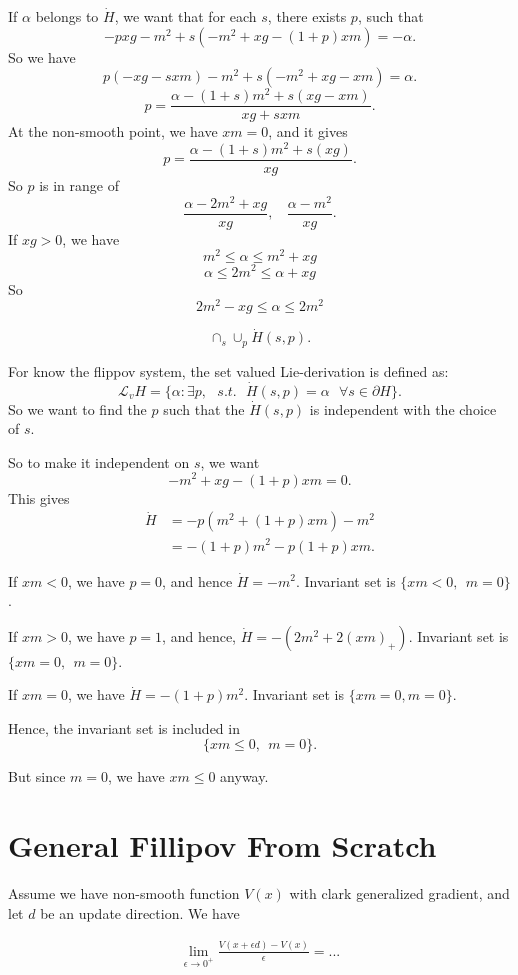 \documentclass[letterpaper,11pt]{article}
\begin{document}
If $\alpha$ belongs to $\dot H$, we want that for each $s$, there exists $p$, such that 
$$
- p x g - m^2 + s (- m^2 + xg - (1+p)xm) = -\alpha.
$$
So we have 
$$
p (-xg - s x m ) - m^2 + s (-m^2 + xg - xm) = \alpha. 
$$
$$
p = \frac{\alpha -(1+s) m^2 + s (xg - xm)}{xg +  s xm}. 
$$
At the non-smooth point, we have $xm =0$, and it gives 
$$
p = \frac{\alpha -(1+s) m^2 + s (xg)}{xg}.  
$$
So $p$ is in range of 
$$
\frac{\alpha - 2m^2 + xg}{xg}, ~~~~ 
\frac{\alpha - m^2 }{xg}. 
$$
If $xg >0$, we have 
$$
m^2 \leq \alpha \leq m^2 + xg
$$
$$
\alpha \leq 2m^2 \leq \alpha + xg 
$$
So 
$$
2m^2  - xg \leq \alpha \leq 2 m^2
$$

$$\cap_{s} \cup_{p} \dot H(s, p).$$


For know the flippov system, the set valued Lie-derivation is defined as:
$$
\mathcal L_v H  =   
\{\alpha \colon \exists p, ~~~ s.t. ~~~ \dot H(s,p) = \alpha ~~~\forall s \in \partial H \}.
$$
So we want to find the $p$ such that the $\dot H(s,p)$ is independent with the choice of $s$. 

So to make it independent on $s$, we want 
$$
-m^2 + xg -(1+p)xm  = 0.
$$
This gives
\begin{align*}
\dot H 
& = -p(m^2 + (1+p) xm)- m^2 \\
& = -(1+p)m^2 - p(1+p) xm. 
\end{align*}

If $xm <0$, we have $p=0$, and hence $\dot H = - m^2$. 
Invariant set is $\{xm < 0, ~~ m=0\}$.

If $xm >0$, we have $p = 1$, and hence, $\dot H = -(2 m^2 + 2 (xm)_+)$. Invariant set is $\{xm=0, ~~ m=0\}.$

If $xm=0$, we have $\dot H = -(1+p) m^2$. Invariant set is $\{xm=0, m = 0\}$. 

Hence, the invariant set is included in 
$$
\{xm \leq 0, ~~ m = 0\}. 
$$

But since $m=0$, we have $xm\leq 0$ anyway. 


\section{General Fillipov From Scratch}

\begin{ctheorem}
Assume we have non-smooth function $V(x)$ with clark generalized gradient, and let $d$ be an update direction. We have 
\end{ctheorem} 
\begin{cproof} 
\begin{align*}
\lim_{\epsilon \to 0^+}\frac{V(x + \epsilon d) - V(x)}{\epsilon} 
= ... 
\end{align*}  
\end{cproof}   
\end{document}
